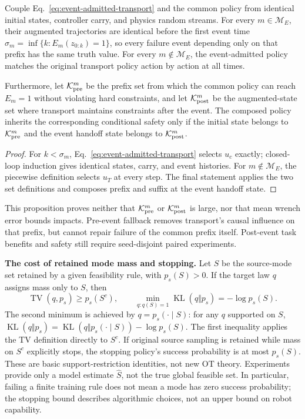 \begin{proposition}
Couple Eq.~\eqref{eq:event-admitted-transport} and the common policy from identical initial states,
controller carry, and physics random streams. For every
$m\in\mathcal M_E$, their augmented trajectories are identical before the first event time
$\sigma_m=\inf\{k:E_m(z_{0:k})=1\}$, so every failure event depending only on
that prefix has the same truth value. For every $m\notin\mathcal M_E$, the event-admitted policy
matches the original transport policy action by action at all times.

Furthermore, let $\mathcal K_{\rm pre}^m$ be the prefix set from which the common policy can reach
$E_m=1$ without violating hard constraints, and let $\mathcal K_{\rm post}^m$ be the augmented-state set
where transport maintains constraints after the event. The composed policy inherits the corresponding conditional safety
only if the initial state belongs to $\mathcal K_{\rm pre}^m$ and the event handoff state belongs to $\mathcal K_{\rm post}^m$.
\end{proposition}
\begin{proof}
For $k<\sigma_m$, Eq.~\eqref{eq:event-admitted-transport} selects $u_c$ exactly;
closed-loop induction gives identical states, carry, and event histories. For $m\notin\mathcal M_E$, the piecewise
definition selects $u_T$ at every step. The final statement applies the two set definitions
and composes prefix and suffix at the event handoff state.
\end{proof}
This proposition proves neither that $\mathcal K_{\rm pre}^m$ or $\mathcal K_{\rm post}^m$ is large,
nor that mean wrench error bounds impacts. Pre-event fallback removes transport's causal influence on that
prefix, but cannot repair failure of the common prefix itself. Post-event task benefits and safety
still require seed-disjoint paired experiments.

\textbf{The cost of retained mode mass and stopping.} Let $S$ be the source-mode set retained
by a given feasibility rule, with $p_s(S)>0$. If the target law $q$ assigns mass only to $S$, then
\[
 \operatorname{TV}(q,p_s)\ge p_s(S^c),\qquad
 \min_{q:q(S)=1}\operatorname{KL}(q\Vert p_s)=-\log p_s(S).
\]
The second minimum is achieved by $q=p_s(\cdot\mid S)$: for any $q$ supported on $S$,
$\operatorname{KL}(q\Vert p_s)=
\operatorname{KL}(q\Vert p_s(\cdot\mid S))-\log p_s(S)$.
The first inequality applies the TV definition directly to $S^c$. If original source sampling is retained while mass
on $S^c$ explicitly stops, the stopping policy's success probability is at most $p_s(S)$.
These are basic support-restriction identities, not new OT theory. Experiments provide only a model estimate
$\widehat S$, not the true global feasible set. In particular, failing a finite training rule
does not mean a mode has zero success probability; the stopping bound describes algorithmic choices, not an upper bound on robot capability.

